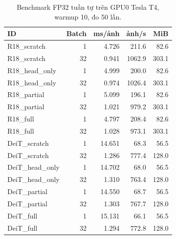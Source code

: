 \begin{table}[htbp]
\centering\small
\caption{Benchmark FP32 tuần tự trên GPU0 Tesla T4, warmup 10, đo 50 lần.}\label{tab:A1bench}
\begin{lrbox}{\reporttable}\begin{tabular}{lrrrr}
\toprule
ID & Batch & ms/ảnh & ảnh/s & MiB \\
\midrule
R18\_scratch & 1 & 4.726 & 211.6 & 82.6 \\
R18\_scratch & 32 & 0.941 & 1062.9 & 303.1 \\
R18\_head\_only & 1 & 4.999 & 200.0 & 82.6 \\
R18\_head\_only & 32 & 0.974 & 1026.4 & 303.1 \\
R18\_partial & 1 & 5.099 & 196.1 & 82.6 \\
R18\_partial & 32 & 1.021 & 979.2 & 303.1 \\
R18\_full & 1 & 4.797 & 208.4 & 82.6 \\
R18\_full & 32 & 1.028 & 973.1 & 303.1 \\
DeiT\_scratch & 1 & 14.651 & 68.3 & 56.5 \\
DeiT\_scratch & 32 & 1.286 & 777.4 & 128.0 \\
DeiT\_head\_only & 1 & 14.702 & 68.0 & 56.5 \\
DeiT\_head\_only & 32 & 1.310 & 763.4 & 128.0 \\
DeiT\_partial & 1 & 14.550 & 68.7 & 56.5 \\
DeiT\_partial & 32 & 1.303 & 767.7 & 128.0 \\
DeiT\_full & 1 & 15.131 & 66.1 & 56.5 \\
DeiT\_full & 32 & 1.294 & 772.8 & 128.0 \\
\bottomrule
\end{tabular}\end{lrbox}
\ifdim\wd\reporttable>\linewidth\resizebox{\linewidth}{!}{\usebox{\reporttable}}\else\usebox{\reporttable}\fi
\end{table}
